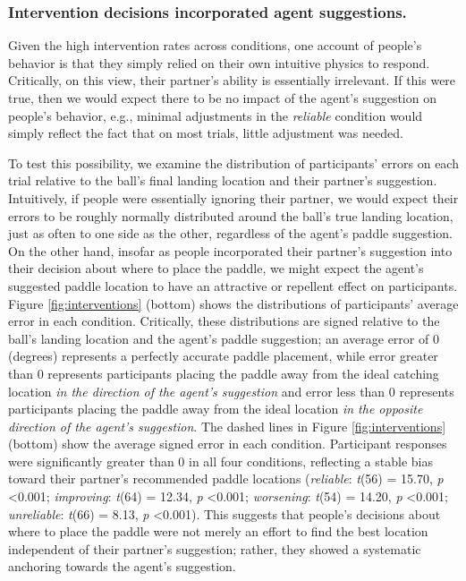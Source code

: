 \documentclass[10pt,letterpaper]{article}
\begin{document}
\subsubsection{Intervention decisions incorporated agent suggestions.}

Given the high intervention rates across conditions, one account of people's behavior is that they simply relied on their own intuitive physics to respond. Critically, on this view, their partner's ability is essentially irrelevant. If this were true, then we would expect there to be no impact of the agent's suggestion on people's behavior, e.g., minimal adjustments in the \textit{reliable} condition would simply reflect the fact that on most trials, little adjustment was needed. 

To test this possibility, we examine the distribution of participants' errors on each trial relative to the ball's final landing location and their partner's suggestion. Intuitively, if people were essentially ignoring their partner, we would expect their errors to be roughly normally distributed around the ball's true landing location, just as often to one side as the other, regardless of the agent's paddle suggestion. On the other hand, insofar as people incorporated their partner's suggestion into their decision about where to place the paddle, we might expect the agent's suggested paddle location to have an attractive or repellent effect on participants. Figure \ref{fig:interventions} (bottom) shows the distributions of participants' average error in each condition. Critically, these distributions are signed relative to the ball's landing location and the agent's paddle suggestion; an average error of 0 (degrees) represents a perfectly accurate paddle placement, while error greater than 0 represents participants placing the paddle away from the ideal catching location \textit{in the direction of the agent's suggestion} and error less than 0 represents participants placing the paddle away from the ideal location \textit{in the opposite direction of the agent's suggestion}. The dashed lines in Figure \ref{fig:interventions} (bottom) show the average signed error in each condition. Participant responses were significantly greater than 0 in all four conditions, reflecting a stable bias toward their partner's recommended paddle locations (\textit{reliable}: \textit{t}(56) = 15.70, \textit{p} \textless{0.001}; \textit{improving}: \textit{t}(64) = 12.34, \textit{p} \textless{0.001}; \textit{worsening}: \textit{t}(54) = 14.20, \textit{p} \textless{0.001}; \textit{unreliable}: \textit{t}(66) = 8.13, \textit{p} \textless{0.001}). This suggests that people's decisions about where to place the paddle were not merely an effort to find the best location independent of their partner's suggestion; rather, they showed a systematic anchoring towards the agent's suggestion.
\end{document}
